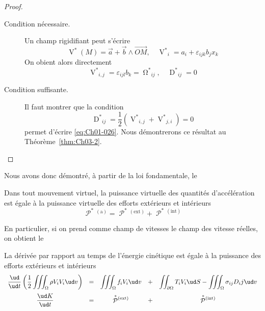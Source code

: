 \begin{proof}\textcolor{white}{.}
    \begin{description}
        \item[Condition nécessaire.] Un champ rigidifiant peut s'écrire 
            \begin{equation}
                \mathop{V}^{\ast}(M) = \vec{a} + \vec{b} \wedge \vec{OM},\quad {\mathop{V}^{\ast}}_i = a_i + \varepsilon_{ijk} b_j x_k
                \label{eq:Ch01-026}
            \end{equation}
            On obient alors directement
            \begin{displaymath}
                {\mathop{V}^{\ast}}_{i,j} = \varepsilon_{ijl}b_k = {\mathop{\Omega}^{\ast}}_{ij},\quad {\mathop{D}^{\ast}}_{ij} = 0
            \end{displaymath}
        \item[Condition suffisante.] Il faut montrer que la condition
            \begin{equation}
                {\mathop{D}^{\ast}}_{ij} = \frac{1}{2} \left( {\mathop{V}^{\ast}}_{i,j} + {\mathop{V}^{\ast}}_{j,i} \right) = 0
                \label{eq:Ch01-027}
            \end{equation}
            permet d'écrire \eqref{eq:Ch01-026}.
            Nous démontrerons ce résultat au Théorème~\ref{thm:Ch03-2}.
    \end{description}
\end{proof}

Nous avons donc démontré, à partir de la loi fondamentale, le

\begin{thm}
    Dans tout mouvement virtuel, la puissance virtuelle des quantités d'accélération est égale à la puissance virtuelle des efforts extérieurs et intérieurs
    \begin{equation}
        \mathop{\mathcal{P}}^{\ast}{\!}^{(\text{a})} = \mathop{\mathcal{P}}^{\ast}{\!}^{(\text{ext})} + \mathop{\mathcal{P}}^{\ast}{\!}^{(\text{int})}
        \label{eq:Ch01-028}
    \end{equation}
\end{thm}

En particulier, si on prend comme champ de vitesses le champ des vitesse réelles, on obtient le

\begin{thm}
    La dérivée par rapport au temps de l'énergie cinétique est égale à la puissance des efforts extérieurs et intérieurs
\begin{equation}
\everymath{\displaystyle} 
    \begin{array}{ccccc}
        \frac{\ud}{\ud t}\left( \frac{1}{2}\iiint_{\Omega} \rho V_iV_i \ud v\right) &=& \iiint_{\Omega} f_i V_i \ud v &+& \iint_{\partial\Omega} T_i V_i \ud S - \iiint_{\Omega} \sigma_{ij} D_ij \ud v\\[12pt]
        \frac{\ud K}{\ud t}  &=& \mathop{\mathcal{P}}^{\ast}{\!}^{(\text{ext})} &+& \mathop{\mathcal{P}}^{\ast}{\!}^{(\text{int})}
    \end{array}
       \label{eq:Ch01-029}
\end{equation}
\end{thm}
